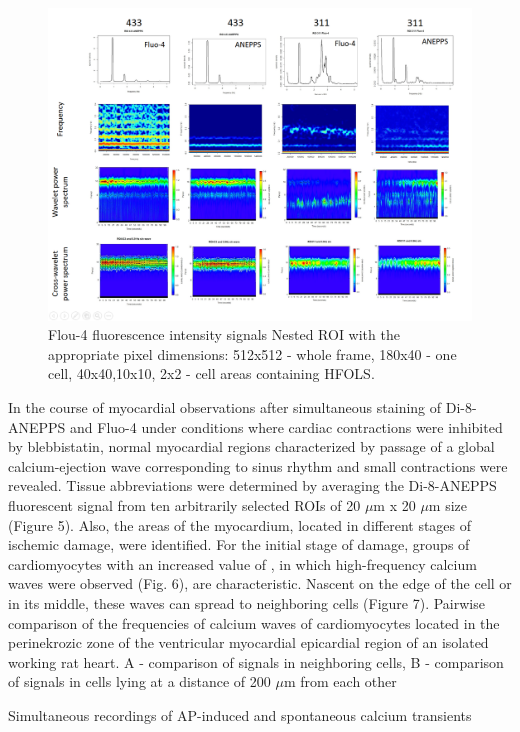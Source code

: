 \documentclass{biophys-new}
\begin{document}
\begin{figure}[hbt!]
\centering
\includegraphics[width=0.9\linewidth]{fig9.png}
\caption{Flou-4 fluorescence intensity signals Nested ROI with the appropriate pixel dimensions: 512x512 - whole frame, 180x40 - one cell, 40x40,10x10, 2x2 - cell areas containing HFOLS. }
\label{fig:fig9}
\end{figure}


In the course of myocardial observations after simultaneous staining of Di-8-ANEPPS and Fluo-4 under conditions where cardiac contractions were inhibited by blebbistatin, normal myocardial regions characterized by passage of a global calcium-ejection wave corresponding to sinus rhythm and small contractions were revealed. Tissue abbreviations were determined by averaging the Di-8-ANEPPS fluorescent signal from ten arbitrarily selected ROIs of 20 $\mu$m x 20 $\mu$m size (Figure 5). Also, the areas of the myocardium, located in different stages of ischemic damage, were identified. For the initial stage of damage, groups of cardiomyocytes with an increased value of , in which high-frequency calcium waves were observed (Fig. 6), are characteristic. Nascent on the edge of the cell or in its middle, these waves can spread to neighboring cells (Figure 7).
Pairwise comparison of the frequencies of calcium waves of cardiomyocytes located in the perinekrozic zone of the ventricular myocardial epicardial region of an isolated working rat heart. A - comparison of signals in neighboring cells, B - comparison of signals in cells lying at a distance of 200 $\mu$m from each other

Simultaneous recordings of AP-induced and spontaneous calcium transients
\end{document}
